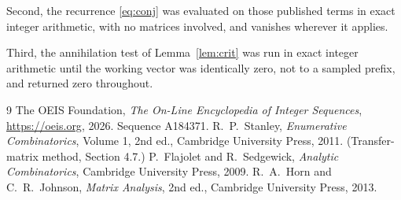 \documentclass[11pt,a4paper]{article}
\theoremstyle{plain}
\theoremstyle{definition}
\begin{document}
Second, the recurrence \eqref{eq:conj} was evaluated on those published terms in exact
integer arithmetic, with no matrices involved, and vanishes wherever it applies.

Third, the annihilation test of Lemma~\ref{lem:crit} was run in exact integer arithmetic
until the working vector was identically zero, not to a sampled prefix, and returned zero
throughout.

\begin{thebibliography}{9}
 The OEIS Foundation, \emph{The On-Line Encyclopedia of Integer
Sequences}, \url{https://oeis.org}, 2026. Sequence A184371.
 R.~P.~Stanley, \emph{Enumerative Combinatorics}, Volume 1, 2nd ed.,
Cambridge University Press, 2011. (Transfer-matrix method, Section 4.7.)
 P.~Flajolet and R.~Sedgewick, \emph{Analytic Combinatorics}, Cambridge
University Press, 2009.
 R.~A.~Horn and C.~R.~Johnson, \emph{Matrix Analysis}, 2nd ed., Cambridge
University Press, 2013.
\end{thebibliography}
\end{document}
